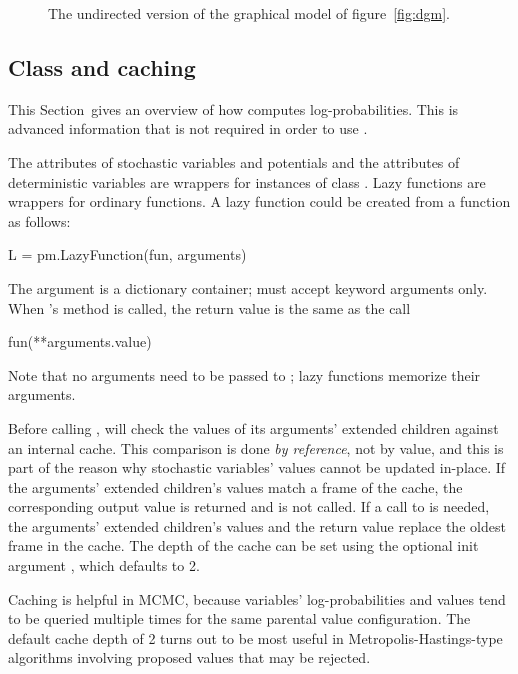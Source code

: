 \documentclass[]{jss}
\begin{document}
\begin{figure}[h!]
\begin{center}
    \caption{The undirected version of the graphical model of figure~\ref{fig:dgm}.}
	\label{fig:dgm-collapsed}
\end{center}
\end{figure}


\subsection[Class LazyFunction and caching]{Class 
and caching}
\label{sec:caching}
This Section~gives an overview of how  computes log-probabilities. This is advanced information that is not required in order to use .

The  attributes of stochastic variables and potentials and the  attributes of deterministic variables are wrappers for instances of class . Lazy functions are wrappers for ordinary  functions. A lazy function  could be created from a function  as follows:
\begin{CodeInput}
L = pm.LazyFunction(fun, arguments)
\end{CodeInput}
The argument  is a dictionary container;  must accept keyword arguments only. When 's  method is called, the return value is the same as the call
\begin{CodeInput}
fun(**arguments.value)
\end{CodeInput}
Note that no arguments need to be passed to ; lazy functions memorize their arguments.

Before calling ,  will check the values of its arguments' extended children against an internal cache. This comparison is done \emph{by reference}, not by value, and this is part of the reason why stochastic variables' values cannot be updated in-place. If the arguments' extended children's values match a frame of the cache, the corresponding output value is returned and  is not called. If a call to  is needed, the arguments' extended children's values and the return value replace the oldest frame in the cache. The depth of the cache can be set using the optional init argument , which defaults to 2.

Caching is helpful in MCMC, because variables' log-probabilities and values tend to be queried multiple times for the same parental value configuration. The default cache depth of 2 turns out to be most useful in Metropolis-Hastings-type algorithms involving proposed values that may be rejected.
\end{document}
